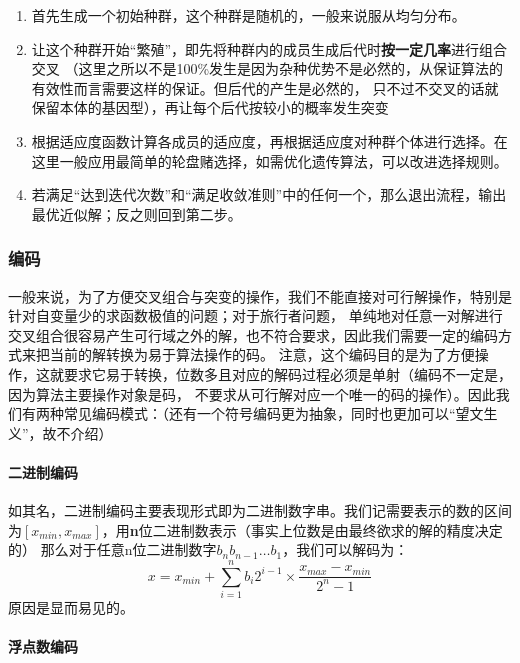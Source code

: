 \documentclass{ctexart}
\begin{document}
\begin{enumerate}
    \item 首先生成一个初始种群，这个种群是随机的，一般来说服从均匀分布。
    \item 让这个种群开始“繁殖”，即先将种群内的成员生成后代时\textbf{按一定几率}进行组合交叉
        （这里之所以不是100\%发生是因为杂种优势不是必然的，从保证算法的有效性而言需要这样的保证。但后代的产生是必然的，
        只不过不交叉的话就保留本体的基因型），再让每个后代按较小的概率发生突变
    \item 根据适应度函数计算各成员的适应度，再根据适应度对种群个体进行选择。在这里一般应用最简单的轮盘赌选择，如需优化遗传算法，可以改进选择规则。
    \item 若满足“达到迭代次数”和“满足收敛准则”中的任何一个，那么退出流程，输出最优近似解；反之则回到第二步。
\end{enumerate}

\subsubsection{编码}

一般来说，为了方便交叉组合与突变的操作，我们不能直接对可行解操作，特别是针对自变量少的求函数极值的问题；对于旅行者问题，
单纯地对任意一对解进行交叉组合很容易产生可行域之外的解，也不符合要求，因此我们需要一定的编码方式来把当前的解转换为易于算法操作的码。
注意，这个编码目的是为了方便操作，这就要求它易于转换，位数多且对应的解码过程必须是单射（编码不一定是，因为算法主要操作对象是码，
不要求从可行解对应一个唯一的码的操作）。因此我们有两种常见编码模式：（还有一个符号编码更为抽象，同时也更加可以“望文生义”，故不介绍）

\paragraph{二进制编码}

如其名，二进制编码主要表现形式即为二进制数字串。我们记需要表示的数的区间为$[x_{min}, x_{max}]$，用\textbf{n}位二进制数表示（事实上位数是由最终欲求的解的精度决定的）
那么对于任意n位二进制数字$b_nb_{n-1}\ldots b_1$，我们可以解码为：
\begin{equation*}
    x = x_{min} + \sum\limits_{i=1}^nb_i2^{i-1}\times\frac{x_{max}-x_{min}}{2^n-1}
\end{equation*}
原因是显而易见的。

\paragraph{浮点数编码}
\end{document}
